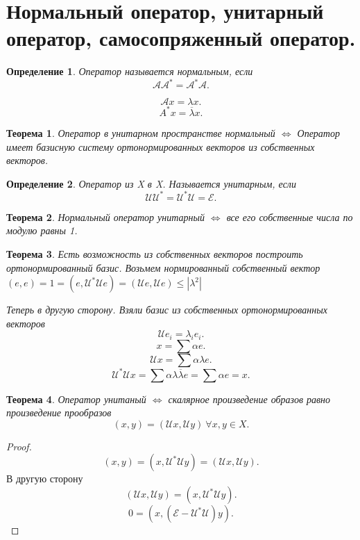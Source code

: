 \documentclass{scrartcl}
\newtheorem{theorem}{Теорема}
\newtheorem{definition}{Определение}
\begin{document}
\section{Нормальный оператор, унитарный оператор, самосопряженный оператор.}
\begin{definition}
    Оператор называется нормальным, если
    \[
        \mathcal{A} \mathcal{A}^{*} = \mathcal{A}^{*} \mathcal{A}
    .\] 
\end{definition}
\[
    \mathcal{A}x = \lambda x
.\] 
\[
A^{*}x = \overline{\lambda} x
.\] 
\begin{theorem}
    Оператор в унитарном пространстве нормальный $\iff$
    Оператор имеет базисную систему ортонормированных векторов из собственных векторов. 
\end{theorem}
\begin{definition}
    Оператор из X  в X. Называется унитарным, если
    \[
        \mathcal{U} \mathcal{U}^{*} = \mathcal{U}^{*} \mathcal{U} = \mathcal{E}
    .\] 
\end{definition}
\begin{theorem}
    Нормальный оператор унитарный $\iff$ все его собственные числа по модулю равны 1.
\end{theorem}
\begin{theorem}
    Есть возможность из собственных векторов построить ортонормированный базис.
    Возьмем нормированный собственный вектор $(e,e) = 1 = (e,\mathcal{U}^{*} \mathcal{U} e) = (\mathcal{U} e,\mathcal{U} e) \le  |\lambda^{2}|$

    Теперь в другую сторону. Взяли базис из собственных ортонормированных векторов
    \[
        \mathcal{U} e_{i} = \lambda_{i}e_{i}
    .\] 
    \[
    x = \sum \alpha e
    .\] 
    \[
        \mathcal{U} x = \sum \alpha \lambda e
    .\] 
    \[
        \mathcal{U}^{*} \mathcal{U} x = \sum \alpha \lambda \overline{\lambda} e =
        \sum \alpha e = x
    .\] 
\end{theorem}
\begin{theorem}
    Оператор унитаный $\iff$ скалярное произведение образов равно произведение прообразов
     \[
         (x,y) =  (\mathcal{U} x, \mathcal{U} y) ~\forall x,y \in X
    .\] 
\end{theorem}
\begin{proof}
    \[
        (x,y) = (x,\mathcal{U}^{*} \mathcal{U} y) = (\mathcal{U} x,\mathcal{U} y)
    .\] 
    В другую сторону
    \[
        (\mathcal{U} x, \mathcal{U} y) = (x,\mathcal{U}^{*} \mathcal{U} y)
    .\] 
    \[
        0 = (x, (\mathcal{E} - \mathcal{U}^{*}\mathcal{U})y)
    .\] 
\end{proof}
\end{document}
